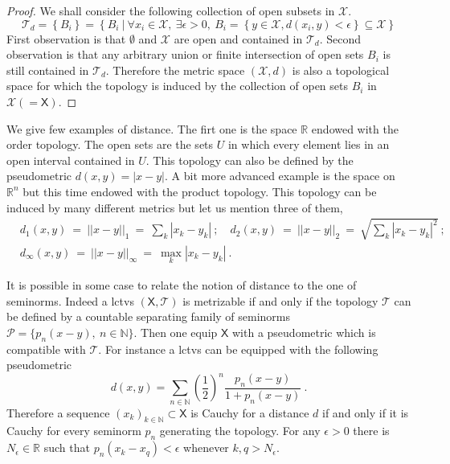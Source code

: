 \documentclass[10pt]{book}
\newcommand{\abs}[1]{\left|#1\right|}
\newcommand{\norm}[1]{\left|\left|#1\right|\right|}
\newcommand{\Pcal}{\mathcal{P}}
\newcommand{\Tcal}{\mathcal{T}}
\newcommand{\Xcal}{\mathcal{X}}
\newcommand{\Nbb}{\mathbb{N}}
\newcommand{\Rbb}{\mathbb{R}}
\newcommand{\Xsf}{\mathsf{X}}
\theoremstyle{break}
\begin{document}
\begin{proof}
We shall consider the following collection of open subsets in $\Xcal$.
%
\begin{equation*}
\Tcal_d = \left\{ B_i \right\} = \left\{B_i \ \bigg| \ \forall x_i \in \Xcal , \ \exists \epsilon > 0, \ B_i = \left\{ y \in \Xcal , d(x_i,y) < \epsilon \right\} \subseteq \Xcal \right\} 
\end{equation*}
%
First observation is that $\emptyset$ and $\Xcal$ are open and contained in $\Tcal_d$. Second observation is that any arbitrary union or finite intersection of open sets $B_i$ is still contained in $\Tcal_d$. Therefore the metric space $(\Xcal,d)$ is also a topological space for which the topology is induced by the collection of open sets $B_i$ in $\Xcal(=\Xsf)$.
\end{proof}
%
We give few examples of distance. The firt one is the space $\Rbb$ endowed with the order topology. The open sets are the sets $U$ in which every element lies in an open interval contained in $U$. This topology can also be defined by the pseudometric $d(x,y) = \abs{x-y}$. 
A bit more advanced example is the space on $\Rbb^n$ but this time endowed with the product topology. This topology can be induced by many different metrics but let us mention three of them,
%
\begin{eqnarray*}
&d_1(x,y) \ = \ \norm{x-y}_1 \ = \ \sum_k \abs{x_k - y_k} \ ; \quad 
d_2(x,y) \ = \ \norm{x-y}_2 \ = \ \sqrt{ \sum_k \abs{x_k - y_k}^2 } \ ;& \\
&d_\infty(x,y) \ = \ \norm{x-y}_\infty \ = \ \max_k \abs{x_k - y_k} \ .&
\end{eqnarray*}
%


\bigskip


It is possible in some case to relate the notion of distance to the one of seminorms. Indeed a lctvs $(\Xsf,\Tcal)$ is metrizable if and only if the topology $\Tcal$ can be defined by a countable separating family of seminorms $\Pcal=\{p_n(x-y), \ n\in\Nbb\}$. Then one equip $\Xsf$ with a pseudometric which is compatible with $\Tcal$. For instance a lctvs can be equipped with the following pseudometric
%
\begin{equation*}
d(x,y) = \sum_{n\in\Nbb} \left(\frac12\right)^n \frac{p_n(x-y)}{1+p_n(x-y)} \ .
\end{equation*}
%
Therefore a sequence $(x_k)_{k\in\Nbb} \subset \Xsf$ is Cauchy for a distance $d$ if and only if it is Cauchy for every seminorm $p_n$ generating the topology. For any $\epsilon > 0$ there is $N_\epsilon \in \Rbb$ such that $p_n(x_k - x_q) < \epsilon$ whenever $k, q > N_\epsilon$.
\end{document}
